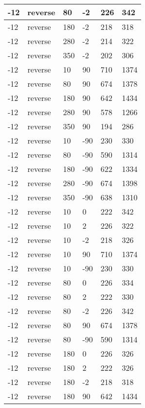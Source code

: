 \begin{table}
\begin{center}
\begin{tabular}{|l|l|l|l|l|l|}
			\hline
			-12 & reverse & 80 & -2 & 226 & 342 \\
			\hline
			-12 & reverse & 180 & -2 & 218 & 318 \\
			\hline
			-12 & reverse & 280 & -2 & 214 & 322 \\
			\hline
			-12 & reverse & 350 & -2 & 202 & 306 \\
			\hline
			-12 & reverse & 10 & 90 & 710 & 1374 \\
			\hline
			-12 & reverse & 80 & 90 & 674 & 1378 \\
			\hline
			-12 & reverse & 180 & 90 & 642 & 1434 \\
			\hline
			-12 & reverse & 280 & 90 & 578 & 1266 \\
			\hline
			-12 & reverse & 350 & 90 & 194 & 286 \\
			\hline
			-12 & reverse & 10 & -90 & 230 & 330 \\
			\hline
			-12 & reverse & 80 & -90 & 590 & 1314 \\
			\hline
			-12 & reverse & 180 & -90 & 622 & 1334 \\
			\hline
			-12 & reverse & 280 & -90 & 674 & 1398 \\
			\hline
			-12 & reverse & 350 & -90 & 638 & 1310 \\
			\hline
			-12 & reverse & 10 & 0 & 222 & 342 \\
			\hline
			-12 & reverse & 10 & 2 & 226 & 322 \\
			\hline
			-12 & reverse & 10 & -2 & 218 & 326 \\
			\hline
			-12 & reverse & 10 & 90 & 710 & 1374 \\
			\hline
			-12 & reverse & 10 & -90 & 230 & 330 \\
			\hline
			-12 & reverse & 80 & 0 & 226 & 334 \\
			\hline
			-12 & reverse & 80 & 2 & 222 & 330 \\
			\hline
			-12 & reverse & 80 & -2 & 226 & 342 \\
			\hline
			-12 & reverse & 80 & 90 & 674 & 1378 \\
			\hline
			-12 & reverse & 80 & -90 & 590 & 1314 \\
			\hline
			-12 & reverse & 180 & 0 & 226 & 326 \\
			\hline
			-12 & reverse & 180 & 2 & 222 & 326 \\
			\hline
			-12 & reverse & 180 & -2 & 218 & 318 \\
			\hline
			-12 & reverse & 180 & 90 & 642 & 1434 \\

\end{tabular}
\end{center}
\end{table}
